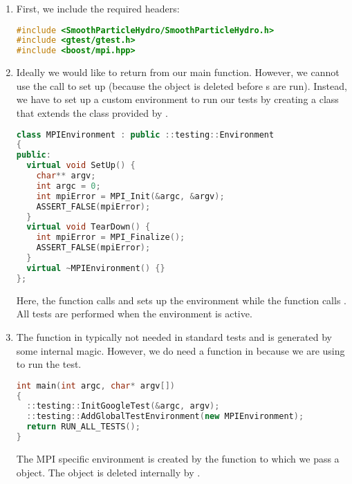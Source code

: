 \begin{enumerate}
  \item First, we include the required headers:
\begin{lstlisting}[language=Cpp]
#include <SmoothParticleHydro/SmoothParticleHydro.h>
#include <gtest/gtest.h>
#include <boost/mpi.hpp>
\end{lstlisting}

  \item Ideally we would like to return  from our main
        function.   However, we cannot use the  call 
        to set up  (because the  object is deleted 
        before s are run).  Instead, we have to set up a custom 
        environment to run our  tests by creating a  
        class that extends the  class provided by 
        .
\begin{lstlisting}[language=Cpp]
class MPIEnvironment : public ::testing::Environment
{
public:
  virtual void SetUp() {
    char** argv;
    int argc = 0;
    int mpiError = MPI_Init(&argc, &argv);
    ASSERT_FALSE(mpiError);
  }
  virtual void TearDown() {
    int mpiError = MPI_Finalize();
    ASSERT_FALSE(mpiError);
  }
  virtual ~MPIEnvironment() {}
};
\end{lstlisting}
       Here, the  function calls  and sets up 
       the environment while the  function calls 
       .  All tests are performed when the environment is active.

  \item The  function in typically not needed in standard 
         tests and is generated by some internal magic.  However, we 
         do need a  function in 
         because we are using  to run the test.
\begin{lstlisting}[language=Cpp]
int main(int argc, char* argv[])
{
  ::testing::InitGoogleTest(&argc, argv);
  ::testing::AddGlobalTestEnvironment(new MPIEnvironment);
  return RUN_ALL_TESTS();
}
\end{lstlisting}
         The MPI specific environment is created by the  
         function to which we pass a  object.  The object is 
         deleted internally by .


\end{enumerate}
